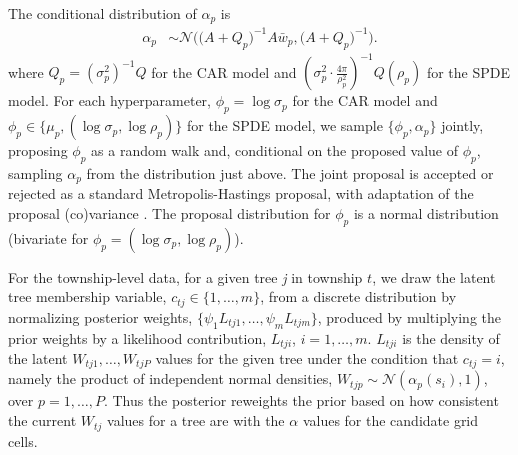 \documentclass[10pt,letterpaper]{article}
\newcommand{\N}{\mathcal{N}}
\begin{document}
The conditional distribution of $\alpha_{p}$ is 
\begin{align}
\alpha_{p} & \sim\N\bigg(\Big(A+Q_{p}\Big)^{-1}A\bar{w}_{p},\Big(A+Q_{p}\Big)^{-1}\bigg).
\end{align}
where $Q_{p}=(\sigma_{p}^{2})^{-1}Q$ for the CAR model and $\left(\sigma_{p}^{2}\cdot\frac{4\pi}{\rho_{p}^{2}}\right)^{-1}Q(\rho_{p})$
for the SPDE model. For each hyperparameter, $\phi_{p}=\log\sigma_{p}$
for the CAR model and $\phi_{p}\in\{\mu_{p},(\log\sigma_{p},\log\rho_{p})\}$
for the SPDE model, we sample $\{\phi_{p},\alpha_{p}\}$ jointly,
proposing $\phi_{p}$ as a random walk and, conditional on the proposed
value of $\phi_{p}$, sampling $\alpha_{p}$ from the distribution
just above. The joint proposal is accepted or rejected as a standard
Metropolis-Hastings proposal, with adaptation of the proposal (co)variance
\cite{Shab:Well:2011}. The proposal distribution for $\phi_{p}$
is a normal distribution (bivariate for $\phi_{p}=(\log\sigma_{p},\log\rho_{p})$).

\noindent 

For the township-level data, for a given tree \emph{j} in township $t$,
we draw the latent tree membership variable, $c_{tj}\in\{1,\ldots,m\}$,
from a discrete distribution by normalizing posterior weights, $\{\psi_{1}L_{tj1},\ldots,\psi_{m}L_{tjm}\}$,
produced by multiplying the prior weights by a likelihood contribution,
$L_{tji}$, $i=1,\ldots,m$. $L_{tji}$ is the density of the latent
$W_{tj1},\ldots,W_{tjP}$ values for the given tree under the condition
that $c_{tj}=i$, namely the product of independent normal densities,
$W_{tjp}\sim\N(\alpha_{p}(s_{i}),1)$, over $p=1,\ldots,P$.
Thus the posterior reweights the prior based on how consistent the
current $W_{tj}$ values for a tree are with the $\alpha$ values
for the candidate grid cells. 
\end{document}
